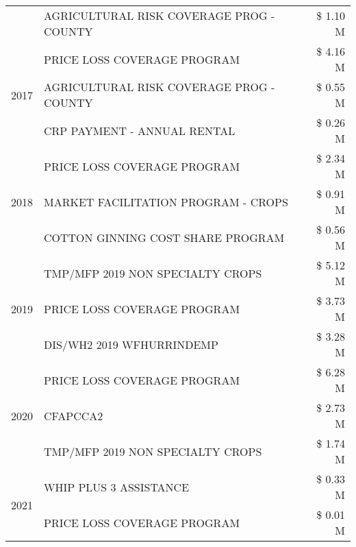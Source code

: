 \begin{tabular}{llr}
 & AGRICULTURAL RISK COVERAGE PROG - COUNTY & \$ 1.10 M \\
\cline{1-3}
\multirow[t]{3}{*}{2017} & PRICE LOSS COVERAGE PROGRAM & \$ 4.16 M \\
 & AGRICULTURAL RISK COVERAGE PROG - COUNTY & \$ 0.55 M \\
 & CRP PAYMENT - ANNUAL RENTAL & \$ 0.26 M \\
\cline{1-3}
\multirow[t]{3}{*}{2018} & PRICE LOSS COVERAGE PROGRAM & \$ 2.34 M \\
 & MARKET FACILITATION PROGRAM - CROPS & \$ 0.91 M \\
 & COTTON GINNING COST SHARE PROGRAM & \$ 0.56 M \\
\cline{1-3}
\multirow[t]{3}{*}{2019} & TMP/MFP 2019 NON SPECIALTY CROPS & \$ 5.12 M \\
 & PRICE LOSS COVERAGE PROGRAM & \$ 3.73 M \\
 & DIS/WH2 2019 WFHURRINDEMP & \$ 3.28 M \\
\cline{1-3}
\multirow[t]{3}{*}{2020} & PRICE LOSS COVERAGE PROGRAM & \$ 6.28 M \\
 & CFAPCCA2 & \$ 2.73 M \\
 & TMP/MFP 2019 NON SPECIALTY CROPS & \$ 1.74 M \\
\cline{1-3}
\multirow[t]{2}{*}{2021} & WHIP PLUS 3 ASSISTANCE & \$ 0.33 M \\
 & PRICE LOSS COVERAGE PROGRAM & \$ 0.01 M \\
\cline{1-3}
\bottomrule
\end{tabular}
